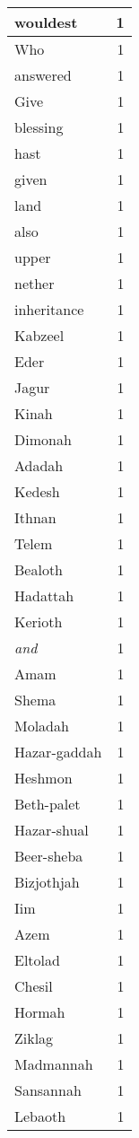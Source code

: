 \begin{center}
\begin{longtable}{l|r}
wouldest & 1\\ \hline 
Who & 1\\ \hline 
answered & 1\\ \hline 
Give & 1\\ \hline 
blessing & 1\\ \hline 
hast & 1\\ \hline 
given & 1\\ \hline 
land & 1\\ \hline 
also & 1\\ \hline 
upper & 1\\ \hline 
nether & 1\\ \hline 
inheritance & 1\\ \hline 
Kabzeel & 1\\ \hline 
Eder & 1\\ \hline 
Jagur & 1\\ \hline 
Kinah & 1\\ \hline 
Dimonah & 1\\ \hline 
Adadah & 1\\ \hline 
Kedesh & 1\\ \hline 
Ithnan & 1\\ \hline 
Telem & 1\\ \hline 
Bealoth & 1\\ \hline 
Hadattah & 1\\ \hline 
Kerioth & 1\\ \hline 
\emph{and} & 1\\ \hline 
Amam & 1\\ \hline 
Shema & 1\\ \hline 
Moladah & 1\\ \hline 
Hazar-gaddah & 1\\ \hline 
Heshmon & 1\\ \hline 
Beth-palet & 1\\ \hline 
Hazar-shual & 1\\ \hline 
Beer-sheba & 1\\ \hline 
Bizjothjah & 1\\ \hline 
Iim & 1\\ \hline 
Azem & 1\\ \hline 
Eltolad & 1\\ \hline 
Chesil & 1\\ \hline 
Hormah & 1\\ \hline 
Ziklag & 1\\ \hline 
Madmannah & 1\\ \hline 
Sansannah & 1\\ \hline 
Lebaoth & 1\\ \hline 

\end{longtable}
\end{center}
